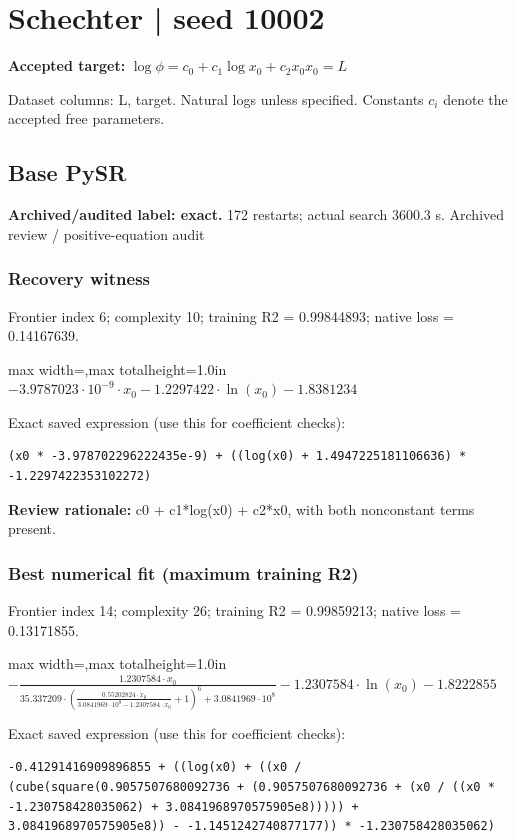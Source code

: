 \documentclass[10pt,letterpaper,landscape]{article}
\begin{document}
\section*{Schechter | seed 10002}
\textbf{Accepted target:} $\displaystyle \log\phi=c_0+c_1\log x_0+c_2x_0$\hfill $x_0=L$\par
{\small Dataset columns: L, target. Natural logs unless specified. Constants $c_i$ denote the accepted free parameters.}\par\medskip
\begin{minipage}[t]{0.485\textwidth}
\subsection*{Base PySR}
\textbf{Archived/audited label: exact.} 172 restarts; actual search 3600.3 s.
{\small Archived review / positive-equation audit}
\subsubsection*{Recovery witness}
Frontier index 6; complexity 10; training R2 = 0.99844893; native loss = 0.14167639.
\begin{center}\begin{adjustbox}{max width=\linewidth,max totalheight=1.0in}$\displaystyle - 3.9787023 \cdot 10^{-9} \cdot x_{0} - 1.2297422 \cdot \ln{\left(x_{0} \right)} - 1.8381234$\end{adjustbox}\end{center}
{\scriptsize Exact saved expression (use this for coefficient checks):}
\begin{lstlisting}
(x0 * -3.978702296222435e-9) + ((log(x0) + 1.4947225181106636) * -1.2297422353102272)
\end{lstlisting}
{\small\textbf{Review rationale:} c0 + c1*log(x0) + c2*x0, with both nonconstant terms present.}
\subsubsection*{Best numerical fit (maximum training R2)}
Frontier index 14; complexity 26; training R2 = 0.99859213; native loss = 0.13171855.
\begin{center}\begin{adjustbox}{max width=\linewidth,max totalheight=1.0in}$\displaystyle - \frac{1.2307584 \cdot x_{0}}{35.337209 \cdot \left(\frac{0.55202824 \cdot x_{0}}{3.0841969 \cdot 10^{8} - 1.2307584 \cdot x_{0}} + 1\right)^{6} + 3.0841969 \cdot 10^{8}} - 1.2307584 \cdot \ln{\left(x_{0} \right)} - 1.8222855$\end{adjustbox}\end{center}
{\scriptsize Exact saved expression (use this for coefficient checks):}
\begin{lstlisting}
-0.41291416909896855 + ((log(x0) + ((x0 / (cube(square(0.9057507680092736 + (0.9057507680092736 + (x0 / ((x0 * -1.230758428035062) + 3.0841968970575905e8))))) + 3.0841968970575905e8)) - -1.1451242740877177)) * -1.230758428035062)
\end{lstlisting}
\end{minipage}\hfill
\end{document}
